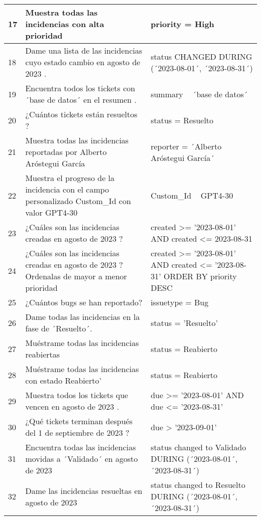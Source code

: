 \begin{center}
\begin{longtable}{ | p{1cm} | p{8cm} | p{6cm} | }
        \hline
        17 & Muestra todas las incidencias con alta prioridad  & priority = High   \\
        \hline
        18 & Dame una lista de las incidencias cuyo estado cambio en agosto de 2023 . & status CHANGED DURING (´2023-08-01´, ´2023-08-31´) \\
        \hline
        19 & Encuentra todos los tickets con ´base de datos´ en el resumen . & summary ~ ´base de datos´   \\
        \hline
        20 & ¿Cuántos tickets están resueltos ? &   status = Resuelto \\
        \hline
        21 & Muestra todas las incidencias reportadas por Alberto Aróstegui García  & reporter = ´Alberto Aróstegui García´   \\
        \hline
        22 & Muestra el progreso de la incidencia con el campo personalizado Custom\_Id con valor GPT4-30 & Custom\_Id ~ GPT4-30   \\
        \hline
        23 & ¿Cuáles son las incidencias creadas en agosto de 2023 ? & created >= '2023-08-01' AND created <= 2023-08-31 \\
        \hline
        24 & ¿Cuáles son las incidencias creadas en agosto de 2023 ? Ordenalas de mayor a menor prioridad & created >= '2023-08-01' AND created <= '2023-08-31' ORDER BY priority DESC \\
        \hline
        25 & ¿Cuántos bugs se han reportado? & issuetype = Bug   \\
        \hline
        26 & Dame todas las incidencias en la fase de ´Resuelto´. &  status = 'Resuelto' \\
        \hline
        27 & Muéstrame todas las incidencias reabiertas  & status = Reabierto   \\
        \hline
        28 & Muéstrame todas las incidencias con estado Reabierto'  & status = Reabierto   \\
        \hline
        29 & Muestra todos los tickets que vencen en agosto de 2023 . & due >= '2023-08-01' AND due <= '2023-08-31' \\
        \hline
        30 & ¿Qué tickets terminan después del 1 de septiembre de 2023 ? & due > '2023-09-01'   \\
        \hline
        31 & Encuentra todas las incidencias movidas a ´Validado´ en agosto de 2023  & status changed to Validado DURING (´2023-08-01´, ´2023-08-31´) \\
        \hline
        32 & Dame las incidencias resueltas en agosto de 2023  & status changed to Resuelto DURING (´2023-08-01´, ´2023-08-31´) \\

\end{longtable}
\end{center}
